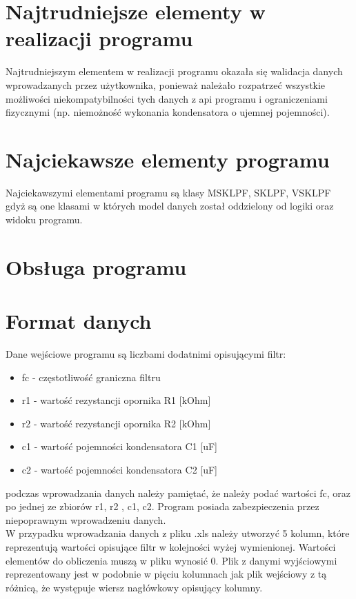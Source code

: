 \documentclass[a4paper,12pt]{article}
\begin{document}
\section{Najtrudniejsze elementy w realizacji programu}

	Najtrudniejszym elementem w realizacji programu okazała się walidacja danych
	wprowadzanych przez użytkownika, ponieważ
	należało rozpatrzeć wszystkie możliwości niekompatybilności tych danych z 
	api programu i ograniczeniami fizycznymi (np. niemożność wykonania kondensatora 
	o ujemnej pojemności).

\section{Najciekawsze elementy programu}

	Najciekawszymi elementami programu są klasy MSKLPF, SKLPF, VSKLPF gdyż
	są one klasami w których model danych został oddzielony od logiki oraz widoku
	programu. 

\section{Obsługa programu}



\section{Format danych}

	Dane wejściowe programu są liczbami dodatnimi opisującymi filtr:
	\begin{itemize}
				\item fc - częstotliwość graniczna filtru
				\item r1 - wartość rezystancji opornika R1 [kOhm]
				\item r2 - wartość rezystancji opornika R2 [kOhm]
				\item c1 - wartość pojemności kondensatora C1 [uF]
				\item c2 - wartość pojemności kondensatora C2 [uF]
	\end{itemize}
	
	podczas wprowadzania danych należy pamiętać, że należy podać wartości 
	fc, oraz po jednej ze zbiorów {r1, r2} , {c1, c2}. Program posiada zabezpieczenia
	przez niepoprawnym wprowadzeniu danych.  \\
	W przypadku wprowadzania danych z pliku .xls należy utworzyć 5 kolumn, które 
	reprezentują wartości opisujące filtr w kolejności wyżej wymienionej.
	Wartości elementów do obliczenia muszą w pliku wynosić 0.
	Plik z danymi wyjściowymi reprezentowany jest w podobnie w pięciu kolumnach
	jak plik wejściowy z tą różnicą, że występuje wiersz nagłówkowy opisujący kolumny.
\end{document}
